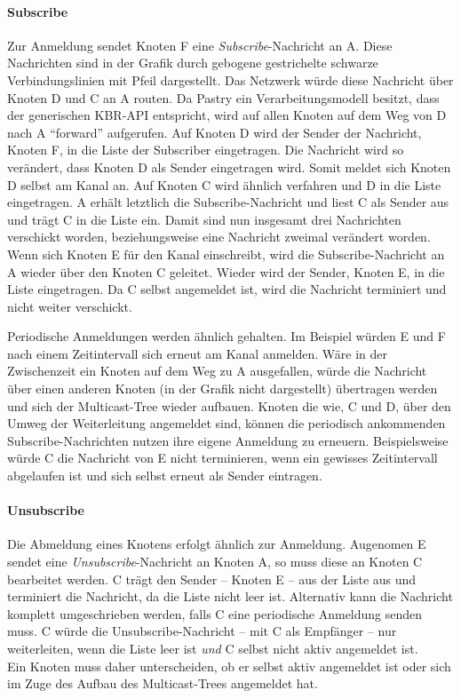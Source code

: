 \paragraph{Subscribe}
Zur Anmeldung sendet Knoten F eine \emph{Subscribe}-Nachricht an A. Diese Nachrichten sind in der Grafik durch gebogene gestrichelte schwarze Verbindungslinien mit Pfeil dargestellt. Das Netzwerk würde diese Nachricht über Knoten D und C an A routen. Da Pastry ein Verarbeitungsmodell besitzt, dass der generischen KBR-API entspricht, wird auf allen Knoten auf dem Weg von D nach A \enquote{forward} aufgerufen. Auf Knoten D wird der Sender der Nachricht, Knoten F, in die Liste der Subscriber eingetragen. Die Nachricht wird so verändert, dass Knoten D als Sender eingetragen wird. Somit meldet sich Knoten D selbst am Kanal an. Auf Knoten C wird ähnlich verfahren und D in die Liste eingetragen. A erhält letztlich die Subscribe-Nachricht und liest C als Sender aus und trägt C in die Liste ein. Damit sind nun insgesamt drei Nachrichten verschickt worden, beziehungsweise eine Nachricht zweimal verändert worden.\\
Wenn sich Knoten E für den Kanal einschreibt, wird die Subscribe-Nachricht an A wieder über den Knoten C geleitet. Wieder wird der Sender, Knoten E, in die Liste eingetragen. Da C selbst angemeldet ist, wird die Nachricht terminiert und nicht weiter verschickt.

Periodische Anmeldungen werden ähnlich gehalten. Im Beispiel würden E und F nach einem Zeitintervall sich erneut am Kanal anmelden. Wäre in der Zwischenzeit ein Knoten auf dem Weg zu A ausgefallen, würde die Nachricht über einen anderen Knoten (in der Grafik nicht dargestellt) übertragen werden und sich der Multicast-Tree wieder aufbauen. Knoten die wie, C und D, über den Umweg der Weiterleitung angemeldet sind, können die periodisch ankommenden Subscribe-Nachrichten nutzen ihre eigene Anmeldung zu erneuern. Beispielsweise würde C die Nachricht von E nicht terminieren, wenn ein gewisses Zeitintervall abgelaufen ist und sich selbst erneut als Sender eintragen.

\paragraph{Unsubscribe}
Die Abmeldung eines Knotens erfolgt ähnlich zur Anmeldung. Augenomen E sendet eine \emph{Unsubscribe}-Nachricht an Knoten A, so muss diese an Knoten C bearbeitet werden. C trägt den Sender -- Knoten E -- aus der Liste aus und terminiert die Nachricht, da die Liste nicht leer ist. Alternativ kann die Nachricht komplett umgeschrieben werden, falls C eine periodische Anmeldung senden muss. C würde die Unsubscribe-Nachricht -- mit C als Empfänger -- nur weiterleiten, wenn die Liste leer ist \emph{und} C selbst nicht aktiv angemeldet ist.\\
Ein Knoten muss daher unterscheiden, ob er selbst aktiv angemeldet ist oder sich im Zuge des Aufbau des Multicast-Trees angemeldet hat.

